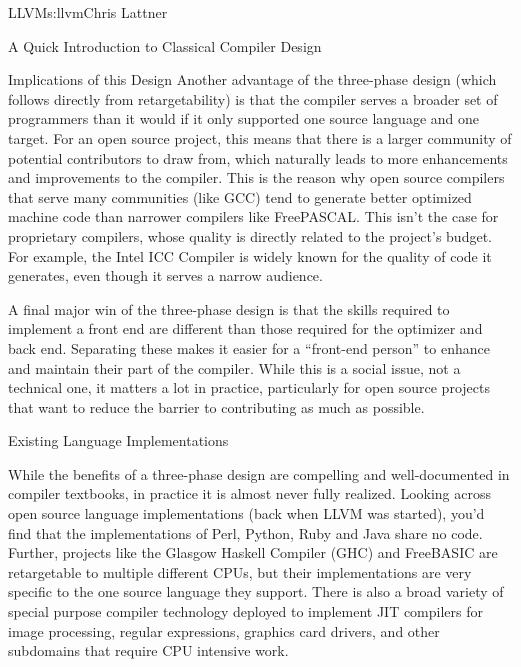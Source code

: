 \begin{aosachapter}{LLVM}{s:llvm}{Chris Lattner}
\begin{aosasect1}{A Quick Introduction to Classical Compiler Design}
\begin{aosasect2}{Implications of this Design}
Another advantage of the three-phase design (which follows directly
from retargetability) is that the compiler serves a broader set of
programmers than it would if it only supported one source language and
one target. For an open source project, this means that there is a
larger community of potential contributors to draw from, which
naturally leads to more enhancements and improvements to the compiler.
This is the reason why open source compilers that serve many
communities (like GCC) tend to generate better optimized machine code
than narrower compilers like FreePASCAL\@.  This isn't the case for
proprietary compilers, whose quality is directly related to the
project's budget.  For example, the Intel ICC Compiler is widely known
for the quality of code it generates, even though it serves a narrow
audience.

A final major win of the three-phase design is that the skills
required to implement a front end are different than those required for
the optimizer and back end.  Separating these makes it easier for a
``front-end person'' to enhance and maintain their part of the
compiler.  While this is a social issue, not a technical one, it
matters a lot in practice, particularly for open source projects
that want to reduce the barrier to contributing as much as possible.

\end{aosasect2}

\end{aosasect1}

\begin{aosasect1}{Existing Language Implementations}

While the benefits of a three-phase design are compelling and
well-documented in compiler textbooks, in practice it is almost never
fully realized. Looking across open source language implementations
(back when LLVM was started), you'd find that the implementations of
Perl, Python, Ruby and Java share no code.  Further, projects like the
Glasgow Haskell Compiler (GHC) and FreeBASIC are retargetable to
multiple different CPUs, but their implementations are very specific
to the one source language they support.  There is also a broad
variety of special purpose compiler technology deployed to implement
JIT compilers for image processing, regular expressions, graphics card
drivers, and other subdomains that require CPU intensive work.


\end{aosasect1}
\end{aosachapter}
